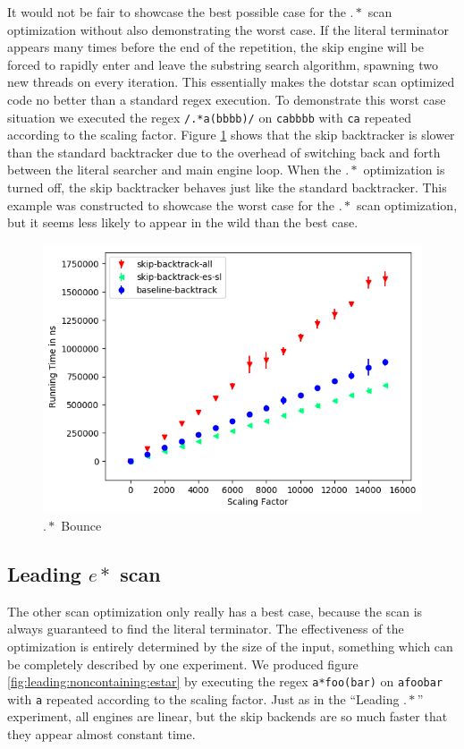 It would not be fair to showcase the best possible case for the
$.*$ scan optimization without also demonstrating the worst
case. If the literal terminator appears many times before the
end of the repetition, the skip engine will be forced to
rapidly enter and leave the substring search algorithm, spawning
two new threads on every iteration. This essentially makes
the dotstar scan optimized code no better than a standard regex
execution. To demonstrate this worst case situation we executed
the regex \verb'/.*a(bbbb)/' on \verb'cabbbb' with \verb'ca'
repeated according to the scaling factor. Figure \ref{fig:dotstar:bounce}
shows that the skip backtracker is slower than the standard
backtracker due to the overhead of switching back and forth between the
literal searcher and main engine loop. When the $.*$ optimization is
turned off, the skip backtracker behaves just like the standard
backtracker. This example was constructed to showcase the worst
case for the $.*$ scan optimization, but it seems less likely to appear
in the wild than the best case.

\begin{figure}
\label{fig:dotstar:bounce}
\caption{$.*$ Bounce}
\includegraphics{resources/dotstar-bounce.png}
\end{figure}

\subsection{Leading $e*$ scan}

The other scan optimization only really has a best case, because
the scan is always guaranteed to find the literal terminator. The
effectiveness of the optimization is entirely determined by the
size of the input, something which can be completely described
by one experiment. We produced figure \ref{fig:leading:noncontaining:estar}
by executing the regex \verb'a*foo(bar)' on \verb'afoobar' with \verb'a'
repeated according to the scaling factor. Just as in the ``Leading $.*$''
experiment, all engines are linear, but the skip backends are so much
faster that they appear almost constant time.

